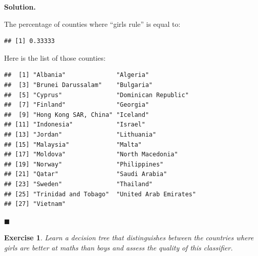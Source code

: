 \documentclass[10pt,b5paper,krantz1]{krantz}
\newenvironment{Shaded}{\begin{snugshade}}{\end{snugshade}}
\newcommand{\DataTypeTok}[1]{\textcolor[rgb]{0.27,0.27,0.27}{#1}}
\newcommand{\DecValTok}[1]{\textcolor[rgb]{0.06,0.06,0.06}{#1}}
\newcommand{\KeywordTok}[1]{\textcolor[rgb]{0.27,0.27,0.27}{\textbf{#1}}}
\newcommand{\NormalTok}[1]{#1}
\newcommand{\OperatorTok}[1]{\textcolor[rgb]{0.43,0.43,0.43}{\textbf{#1}}}
\newcommand{\OtherTok}[1]{\textcolor[rgb]{0.37,0.37,0.37}{#1}}
\newcommand{\StringTok}[1]{\textcolor[rgb]{0.5,0.5,0.5}{#1}}
\newtheorem{exercise}{Exercise}[chapter]
\newenvironment{solution}{%
\bigskip\noindent\textbf{Solution. }%
\it\ignorespaces%
\ignorespaces%
}{\ignorespaces%
\hfill$\blacksquare$%
}
\begin{document}
\begin{solution}
The percentage of counties where ``girls rule'' is equal to:

\begin{Shaded}
\end{Shaded}

\begin{verbatim}
## [1] 0.33333
\end{verbatim}

Here is the list of those counties:

\begin{Shaded}
\end{Shaded}

\begin{verbatim}
##  [1] "Albania"              "Algeria"             
##  [3] "Brunei Darussalam"    "Bulgaria"            
##  [5] "Cyprus"               "Dominican Republic"  
##  [7] "Finland"              "Georgia"             
##  [9] "Hong Kong SAR, China" "Iceland"             
## [11] "Indonesia"            "Israel"              
## [13] "Jordan"               "Lithuania"           
## [15] "Malaysia"             "Malta"               
## [17] "Moldova"              "North Macedonia"     
## [19] "Norway"               "Philippines"         
## [21] "Qatar"                "Saudi Arabia"        
## [23] "Sweden"               "Thailand"            
## [25] "Trinidad and Tobago"  "United Arab Emirates"
## [27] "Vietnam"
\end{verbatim}

\end{solution}

\begin{exercise}

Learn a decision tree that distinguishes between the countries where
girls are better at maths than boys and assess the quality of this classifier.

\end{exercise}
\end{document}
